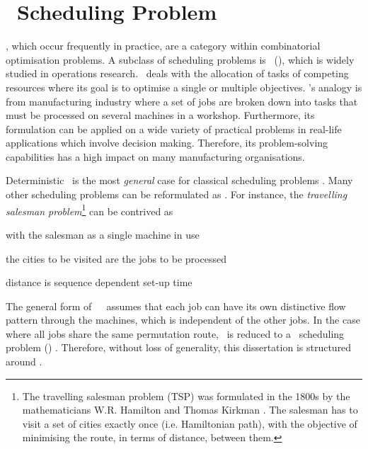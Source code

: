 
\chapter{\Jsp\ Scheduling Problem}\label{ch:scheduling}
, which occur frequently in practice, are 
a category within combinatorial optimisation problems. 
A subclass of scheduling problems is \jsp\ (\JSP), which 
is widely studied in operations research. 
\JSP\ deals with the allocation of tasks of competing resources where its goal 
is to optimise a single or multiple objectives. 
\Jsp's analogy is from manufacturing industry where a set of jobs are broken down into tasks that must be processed on several machines in a workshop. 
Furthermore, its formulation can be applied on a wide variety of practical 
problems in real-life applications which involve decision making. Therefore, 
its problem-solving capabilities has a high impact on many manufacturing 
organisations. %

Deterministic \JSP\ is the most \emph{general} case for classical scheduling problems \citep{Jain99}. 
Many other scheduling problems can be reformulated as \JSP. 
For instance, the \textit{travelling salesman problem}\footnote{
    The travelling salesman problem (TSP) was formulated in the 1800s by the 
    mathematicians W.R. Hamilton and Thomas Kirkman \citep{graphtheory}. 
    The salesman has to visit a set of cities exactly once (i.e. Hamiltonian 
    path), with the objective of minimising the route, in terms of distance, 
    between them.}
 can be contrived as \JSP
\begin{enumerate*}[label={{}}]
    \item with the salesman as a single machine in use
    \item the cities to be visited are the jobs to be processed
    \item distance is sequence dependent set-up time
\end{enumerate*}
The general form of~~\JSP\ assumes that each job can have its own 
distinctive flow pattern through the machines, which is independent of the 
other jobs. 
In the case where all jobs share the same permutation route, \jsp\ is reduced 
to a \fsp\ scheduling problem (\FSP) \citep{Guinet1998,Tay08}. 
Therefore, without loss of generality, this dissertation is structured around 
\JSP. 

